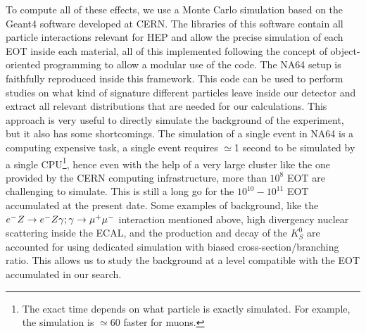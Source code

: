To compute all of these effects, we use a Monte Carlo simulation based on the Geant4 software \cite{AGOSTINELLI2003250,1610988} developed at CERN. The libraries of this software contain all particle interactions relevant for HEP and allow the precise simulation of each EOT inside each material, all of this implemented following the concept of object-oriented programming to allow a modular use of the code. The NA64 setup is faithfully reproduced inside this framework. This code can be used to perform studies on what kind of signature different particles leave inside our detector and extract all relevant distributions that are needed for our calculations. This approach is very useful to directly simulate the background of the experiment, but it also has some shortcomings. The simulation of a single event in NA64 is a computing expensive task, a single event requires $\simeq$1 second to be simulated by a single CPU\footnote{The exact time depends on what particle is exactly simulated. For example, the simulation is $\simeq$60 faster for muons.}, hence even with the help of a very large cluster like the one provided by the CERN computing infrastructure, more than $10^8$ EOT are challenging to simulate. This is still a long go for the $10^{10}-10^{11}$ EOT accumulated at the present date. Some examples of background, like the $e^- Z \to e^- Z \gamma; \gamma \to \mu^+ \mu^-$ interaction mentioned above, high divergency nuclear scattering inside the ECAL, and the production and decay of the $K^0_S$ are accounted for using dedicated simulation with biased cross-section/branching ratio. This allows us to study the background at a level compatible with the EOT accumulated in our search.

